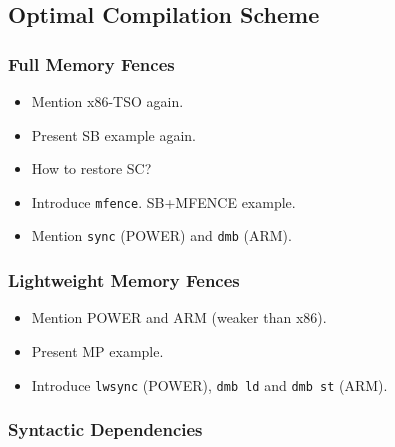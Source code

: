 

\subsection{Optimal Compilation Scheme}

\subsubsection{Full Memory Fences}

\begin{itemize}
  \item Mention x86-TSO again.
  \item Present SB example again. 
  \item How to restore SC?
  \item Introduce \texttt{mfence}. SB+MFENCE example.
  \item Mention \texttt{sync} (POWER) and \texttt{dmb} (ARM).
\end{itemize}

\subsubsection{Lightweight Memory Fences}

\begin{itemize}
  \item Mention POWER and ARM (weaker than x86).
  \item Present MP example. 
  \item Introduce \texttt{lwsync} (POWER), \texttt{dmb ld} and \texttt{dmb st} (ARM).
\end{itemize}

\subsubsection{Syntactic Dependencies}

